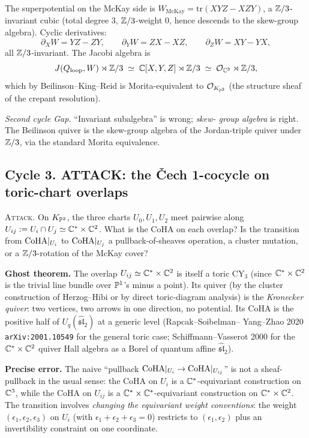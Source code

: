 The superpotential on the McKay side is
$W_{\mathrm{McKay}}=\mathrm{tr}(XYZ-XZY)$, a $\mathbb{Z}/3$-invariant cubic
(total degree $3$, $\mathbb{Z}/3$-weight $0$, hence descends to the skew-group
algebra). Cyclic derivatives:
\[
\partial_XW=YZ-ZY,\qquad\partial_YW=ZX-XZ,\qquad\partial_ZW=XY-YX,
\]
all $\mathbb{Z}/3$-invariant. The Jacobi algebra is
\[
J(Q_{\mathrm{loop}},W)\rtimes\mathbb{Z}/3\;\simeq\;
\mathbb{C}[X,Y,Z]\rtimes\mathbb{Z}/3\;\simeq\;\mathcal{O}_{\mathbb{C}^3}\rtimes\mathbb{Z}/3,
\]
which by Beilinson--King--Reid is Morita-equivalent to
$\mathcal{O}_{K_{\mathbb{P}^2}}$ (the structure sheaf of the crepant resolution).

\emph{Second cycle Gap.} ``Invariant subalgebra'' is wrong; \emph{skew-
group algebra} is right. The Beilinson quiver is the skew-group algebra
of the Jordan-triple quiver under $\mathbb{Z}/3$, via the standard Morita
equivalence.

\subsection*{Cycle 3. ATTACK: the \v Cech 1-cocycle on toric-chart
overlaps}

\textsc{Attack.} On $K_{\mathbb{P}^2}$, the three charts $U_0,U_1,U_2$ meet
pairwise along $U_{ij}:=U_i\cap U_j\simeq\mathbb{C}^*\times\mathbb{C}^2$. What is the
CoHA on each overlap? Is the transition from $\mathrm{CoHA}|_{U_i}$ to
$\mathrm{CoHA}|_{U_j}$ a pullback-of-sheaves operation, a cluster mutation, or
a $\mathbb{Z}/3$-rotation of the McKay cover?

\textbf{Ghost theorem.} The overlap $U_{ij}\simeq\mathbb{C}^*\times\mathbb{C}^2$ is
itself a toric CY$_3$ (since $\mathbb{C}^*\times\mathbb{C}^2$ is the trivial line
bundle over $\mathbb{P}^1$'s minus a point). Its quiver (by the cluster
construction of Herzog--Hibi or by direct toric-diagram analysis) is
the \emph{Kronecker quiver}: two vertices, two arrows in one direction,
no potential. Its CoHA is the positive half of
$U_q(\widehat{\mathfrak{sl}}_2)$ at a generic level (Rapcak--Soibelman--
Yang--Zhao 2020 \texttt{arXiv:2001.10549} for the general toric case;
Schiffmann--Vasserot 2000 for the $\mathbb{C}^*\times\mathbb{C}^2$ quiver Hall algebra
as a Borel of quantum affine $\widehat{\mathfrak{sl}}_2$).

\textbf{Precise error.} The naive ``pullback $\mathrm{CoHA}|_{U_i}\to
\mathrm{CoHA}|_{U_{ij}}$'' is not a sheaf-pullback in the usual sense: the CoHA
on $U_i$ is a $\mathbb{C}^*$-equivariant construction on $\mathbb{C}^3$, while the
CoHA on $U_{ij}$ is a $\mathbb{C}^*\times\mathbb{C}^*$-equivariant construction on
$\mathbb{C}^*\times\mathbb{C}^2$. The transition involves \emph{changing the
equivariant weight conventions}: the weight $(\epsilon_1,\epsilon_2,
\epsilon_3)$ on $U_i$ (with $\epsilon_1+\epsilon_2+\epsilon_3=0$)
restricts to $(\epsilon_1,\epsilon_2)$ plus an invertibility constraint
on one coordinate.

